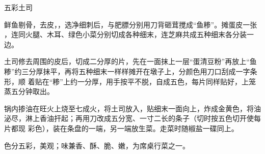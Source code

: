 \begin{recipe}{五彩土司}

\ingredients


\preparation

\step 鲜鱼剔骨，去皮，，选净细刺后，与肥膘分别用刀背砸茸搅成“鱼糁”。摊蛋皮一张
，连同火腿、木耳、绿色小菜分别切成各种细末，连芝麻共成五种细末各分装一边。

\step 土司修去周围的皮后，切成二分厚的片，先在一面抹上一层“蛋清豆粉”再放上“鱼
糁”约三分厚抹平，再将五种细末一样样摊开在墩子上，分颜色用刀口刮成一字条形，顺
着贴在“糁”上约一分厚，用手按平不脱，自成五色，每片同样贴好，上笼蒸五分钟取出。

\step 锅内掺油在旺火上烧至七成火，将土司放入，贴细末一面向上，炸成金黄色，将油
泌尽，淋上香油扞起；再用刀改成五分宽、一寸二长的条子（切时按五色切开使每片都现
彩色），装在条盘的一端，另一端放生菜。走菜时随椒盐一碟同上。

\features

色分五彩，美观；味兼香、酥、脆、嫩，为席桌行菜之一。

\end{recipe}


